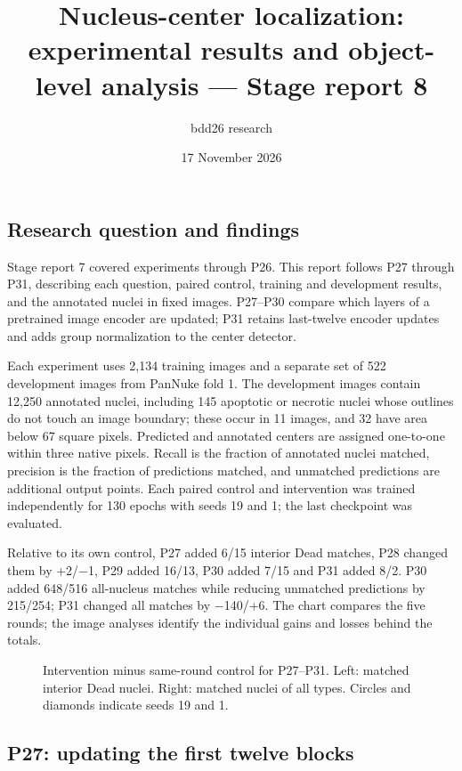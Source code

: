\documentclass[
  11pt,
]{article}
\title{Nucleus-center localization: experimental results and
object-level analysis --- Stage report 8}
\author{bdd26 research}
\date{17 November 2026}
\begin{document}
\maketitle

{
\setcounter{tocdepth}{2}
\tableofcontents
\newpage
}
\subsection{Research question and
findings}\label{research-question-and-findings}

Stage report 7 covered experiments through P26. This report follows P27
through P31, describing each question, paired control, training and
development results, and the annotated nuclei in fixed images. P27--P30
compare which layers of a pretrained image encoder are updated; P31
retains last-twelve encoder updates and adds group normalization to the
center detector.

Each experiment uses 2,134 training images and a separate set of 522
development images from PanNuke fold 1. The development images contain
12,250 annotated nuclei, including 145 apoptotic or necrotic nuclei
whose outlines do not touch an image boundary; these occur in 11 images,
and 32 have area below 67 square pixels. Predicted and annotated centers
are assigned one-to-one within three native pixels. Recall is the
fraction of annotated nuclei matched, precision is the fraction of
predictions matched, and unmatched predictions are additional output
points. Each paired control and intervention was trained independently
for 130 epochs with seeds 19 and 1; the last checkpoint was evaluated.

Relative to its own control, P27 added 6/15 interior Dead matches, P28
changed them by +2/−1, P29 added 16/13, P30 added 7/15 and P31 added
8/2. P30 added 648/516 all-nucleus matches while reducing unmatched
predictions by 215/254; P31 changed all matches by −140/+6. The chart
compares the five rounds; the image analyses identify the individual
gains and losses behind the totals.

\begin{figure}[H]\centering\caption{Intervention minus same-round control for P27–P31. Left: matched interior Dead nuclei. Right: matched nuclei of all types. Circles and diamonds indicate seeds 19 and 1.}\end{figure}

\subsection{P27: updating the first twelve
blocks}\label{p27-updating-the-first-twelve-blocks}
\end{document}
